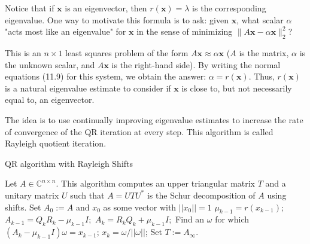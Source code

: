 \documentclass[12pt]{article}
\begin{document}
	Notice that if $\mathbf{x}$ is an eigenvector, then $r(\mathbf{x}) = \lambda$ is the corresponding eigenvalue. One way to motivate this formula is to ask: given $\mathbf{x}$, what scalar $\alpha$ 
	"acts most like an eigenvalue" for $\mathbf{x}$ in the sense of minimizing $\| A\mathbf{x} - \alpha \mathbf{x} \|_2^2$? 
	
	This is an $n \times 1$ least squares problem of the form $A\mathbf{x} \approx \alpha \mathbf{x}$ 
	($A$ is the matrix, $\alpha$ is the unknown scalar, and $A\mathbf{x}$ is the right-hand side). By writing the normal equations (11.9) for this system, we obtain the answer: $\alpha = r(\mathbf{x})$. Thus, $r(\mathbf{x})$ is a natural eigenvalue estimate to consider if $\mathbf{x}$ is close to, but not necessarily equal to, an eigenvector.
	
	The idea is to use continually improving eigenvalue estimates to increase the rate of convergence of the QR iteration at every step. This algorithm is called Rayleigh quotient iteration.
		\begin{algorithm}[H]
		\caption{QR algorithm with Rayleigh Shifts}
		\begin{algorithmic}[1]
			\Require Let $A \in \mathbb{C}^{n \times n}$. This algorithm computes an upper triangular matrix $T$ and a unitary matrix $U$ such that $A = UTU^*$ is the Schur decomposition of $A$ using shifts.
			\State Set $A_0 := A$ and $x_0$ as some vector with $||x_0||= 1$
			\State $\mu_{k-1} = r(x_{k-1});$
			\State $A_{k-1} = Q_k R_k - \mu_{k-1} I;$ 
			\State $A_k = R_k Q_k + \mu_{k-1} I;$
			\State Find an $\omega$ for which $(A_k -\mu_{k-1} I)\omega = x_{k-1}$;
			\State $x_k = \omega / ||\omega||$;
			\EndFor
			\State Set $T := A_{\infty}.$ 
		\end{algorithmic}
	\end{algorithm}
\end{document}
